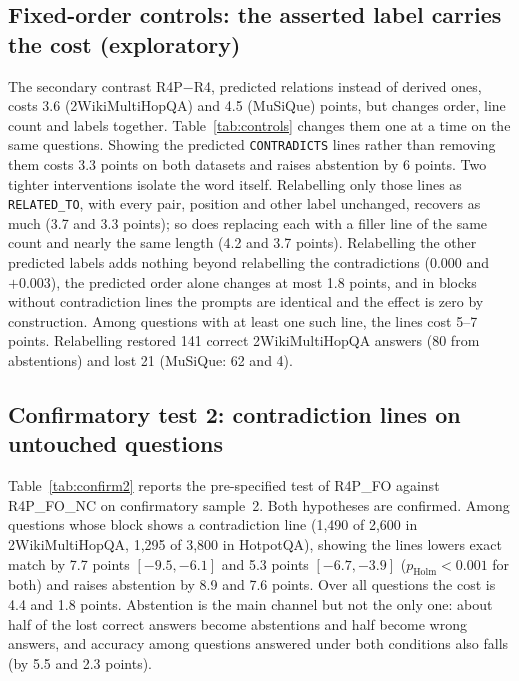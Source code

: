 \subsection{Fixed-order controls: the asserted label carries the cost (exploratory)}

The secondary contrast R4P$-$R4, predicted relations instead of derived ones, costs 3.6 (2WikiMultiHopQA) and 4.5 (MuSiQue) points, but changes order, line count and labels together. Table~\ref{tab:controls} changes them one at a time on the same questions. Showing the predicted \texttt{CONTRADICTS} lines rather than removing them costs 3.3 points on both datasets and raises abstention by 6 points. Two tighter interventions isolate the word itself. Relabelling only those lines as \texttt{RELATED\_TO}, with every pair, position and other label unchanged, recovers as much (3.7 and 3.3 points); so does replacing each with a filler line of the same count and nearly the same length (4.2 and 3.7 points). Relabelling the other predicted labels adds nothing beyond relabelling the contradictions ($0.000$ and $+0.003$), the predicted order alone changes at most 1.8 points, and in blocks without contradiction lines the prompts are identical and the effect is zero by construction. Among questions with at least one such line, the lines cost 5--7 points. Relabelling restored 141 correct 2WikiMultiHopQA answers (80 from abstentions) and lost 21 (MuSiQue: 62 and 4).



\subsection{Confirmatory test 2: contradiction lines on untouched questions}

Table~\ref{tab:confirm2} reports the pre-specified test of R4P\_FO against R4P\_FO\_NC on confirmatory sample~2. Both hypotheses are confirmed. Among questions whose block shows a contradiction line (1{,}490 of 2{,}600 in 2WikiMultiHopQA, 1{,}295 of 3{,}800 in HotpotQA), showing the lines lowers exact match by 7.7 points $[-9.5, -6.1]$ and 5.3 points $[-6.7, -3.9]$ ($p_{\text{Holm}}<0.001$ for both) and raises abstention by 8.9 and 7.6 points. Over all questions the cost is 4.4 and 1.8 points. Abstention is the main channel but not the only one: about half of the lost correct answers become abstentions and half become wrong answers, and accuracy among questions answered under both conditions also falls (by 5.5 and 2.3 points).

